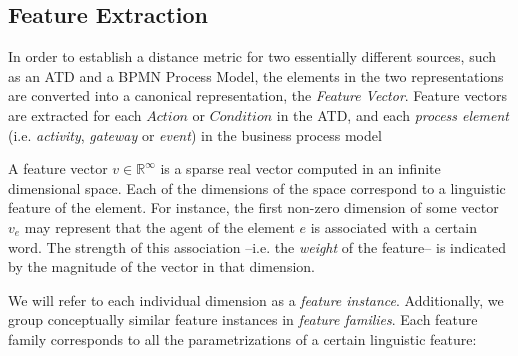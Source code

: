 \subsection{Feature Extraction}


In order to establish a distance metric for two essentially different sources, such as
an ATD and a BPMN Process Model, the elements in the two representations are
converted into a canonical representation, the \emph{Feature Vector}. Feature
vectors are extracted for each $Action$ or $Condition$ in the ATD, and each
\emph{process element} (i.e. \emph{activity}, \emph{gateway} or \emph{event}) in
the business process model

A feature vector $v \in \mathbb{R}^\infty$ is a sparse real vector computed in
an infinite dimensional space. Each of the dimensions of the space correspond to
a linguistic feature of the element. For instance, the first non-zero dimension
of some vector $v_e$ may represent that the agent of the element $e$ is
associated with a certain word. The strength of this association --i.e. the
\emph{weight} of the feature-- is indicated by the magnitude of the vector in
that dimension.

We will refer to each individual dimension as a \emph{feature instance}.
Additionally, we group conceptually similar feature instances in \emph{feature
  families}. Each feature family corresponds to all the parametrizations of a
certain linguistic feature:

